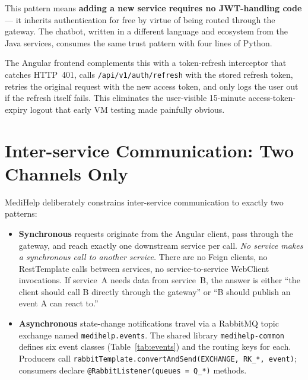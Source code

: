 \documentclass[12pt]{caltech_thesis}
\begin{document}
This pattern means \textbf{adding a new service requires no JWT-handling
code} --- it inherits authentication for free by virtue of being routed
through the gateway. The chatbot, written in a different language and
ecosystem from the Java services, consumes the same trust pattern with
four lines of Python.

The Angular frontend complements this with a token-refresh interceptor
that catches HTTP~401, calls \texttt{/api/v1/auth/refresh} with the stored
refresh token, retries the original request with the new access token,
and only logs the user out if the refresh itself fails. This eliminates
the user-visible 15-minute access-token-expiry logout that early VM
testing made painfully obvious.

\section{Inter-service Communication: Two Channels Only}
\label{sec:async}

MediHelp deliberately constrains inter-service communication to exactly
two patterns:
\begin{itemize}
    \item \textbf{Synchronous} requests originate from the Angular client,
    pass through the gateway, and reach exactly one downstream service per
    call. \textit{No service makes a synchronous call to another service.}
    There are no Feign clients, no RestTemplate calls between services,
    no service-to-service WebClient invocations. If service~A needs data
    from service~B, the answer is either ``the client should call B
    directly through the gateway'' or ``B should publish an event A can
    react to.''
    \item \textbf{Asynchronous} state-change notifications travel via
    a RabbitMQ topic exchange named \texttt{medihelp.events}. The shared
    library \texttt{medihelp-common} defines six event classes
    (Table~\ref{tab:events}) and the routing keys for each. Producers call
    \texttt{rabbitTemplate.convertAndSend(EXCHANGE, RK\_*, event)};
    consumers declare \texttt{@RabbitListener(queues = Q\_*)} methods.
\end{itemize}
\end{document}
